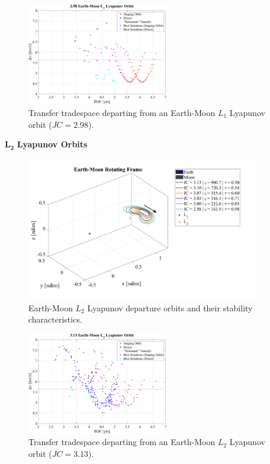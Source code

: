 \begin{figure}[ht]
    \centering
    \includegraphics[width=0.55\textwidth]{figures/TradeSpace_L1Lyapunov_2_98.pdf}
    \caption{Transfer tradespace departing from an Earth-Moon $L_{1}$ Lyapunov orbit ($JC=2.98$).}
\end{figure}
\clearpage

$\pmb{L_{2}}$ \textbf{Lyapunov Orbits}
\begin{figure}[ht]
    \centering
    \includegraphics[width=0.9\textwidth]{figures/L2LyapunovDepartureOrbits.pdf}
    \caption{Earth-Moon $L_{2}$ Lyapunov departure orbits and their stability characteristics.}
\end{figure}
\clearpage

\begin{figure}[ht]
    \centering
    \includegraphics[width=0.55\textwidth]{figures/TradeSpace_L2Lyapunov_3_13.pdf}
    \caption{Transfer tradespace departing from an Earth-Moon $L_{2}$ Lyapunov orbit ($JC=3.13$).}
\end{figure}


